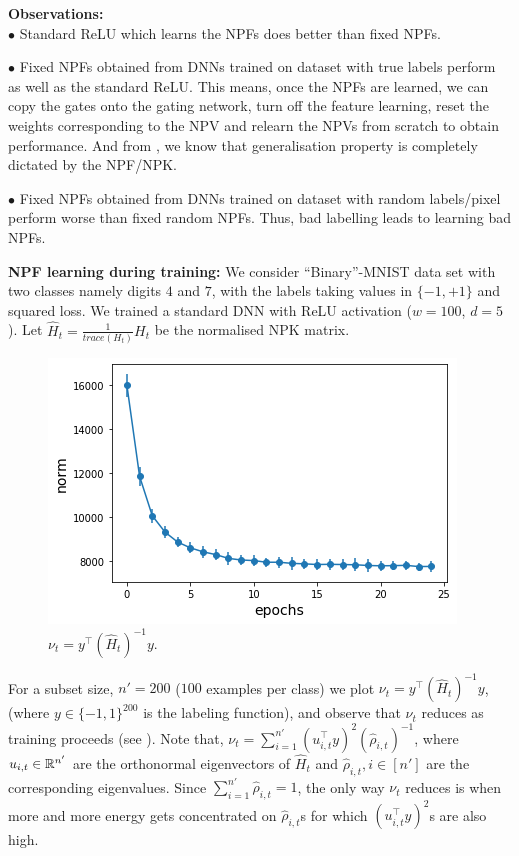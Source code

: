 \textbf{Observations:}\\
$\bullet$ Standard ReLU which learns the NPFs does better than fixed NPFs.

$\bullet$ Fixed NPFs obtained from DNNs trained on dataset with true labels perform as well as the standard ReLU. This means, once the NPFs are learned, we can copy the gates onto the gating network, turn off the feature learning, reset the weights corresponding to the NPV and relearn the NPVs from scratch to obtain performance. And from , we know that generalisation property is completely dictated by the NPF/NPK.

$\bullet$ Fixed NPFs obtained from DNNs trained on dataset with random labels/pixel perform worse than fixed random NPFs. Thus, bad labelling leads to learning bad NPFs.

\textbf{NPF learning during training:} We consider ``Binary''-MNIST data set with two classes namely digits $4$ and $7$, with the labels taking values in $\{-1,+1\}$ and squared loss. We trained a standard DNN with ReLU activation ($w=100$, $d=5$). Let $\widehat{H}_t=\frac{1}{trace(H_t)}H_t$ be the normalised NPK matrix. 
\begin{figure}
\includegraphics[scale=0.25]{figs/path-gram.png}
\caption{\label{fig:gen}$\nu_t=y^\top (\widehat{H}_t)^{-1} y$.}
\end{figure}
For a subset size, $n'=200$ ($100$ examples per class) we plot $\nu_t=y^\top (\widehat{H}_t)^{-1} y$, (where $y\in\{-1,1\}^{200}$ is the labeling function), and observe that $\nu_t$ reduces as training proceeds (see ). Note that, $\nu_t=\sum_{i=1}^{n'}(u_{i,t}^\top y)^2 (\hat{\rho}_{i,t})^{-1}$, where $u_{i,t}\in \mathbb{R}^{n'}$ are the orthonormal eigenvectors of $\widehat{H}_t$ and $\hat{\rho}_{i,t},i\in[n']$ are the corresponding eigenvalues. Since $\sum_{i=1}^{n'}\hat{\rho}_{i,t}=1$, the only way $\nu_t$ reduces is when more and more energy gets concentrated on $\hat{\rho}_{i,t}$s for which $(u_{i,t}^\top y)^2$s are also high.\WFclear%
